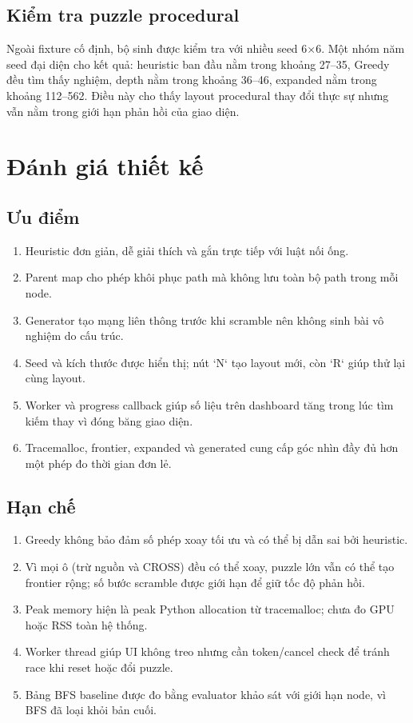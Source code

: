 \documentclass[12pt,a4paper]{article}
\begin{document}
\subsection{Kiểm tra puzzle procedural}
Ngoài fixture cố định, bộ sinh được kiểm tra với nhiều seed 6\(\times\)6. Một nhóm năm seed đại diện cho kết quả: heuristic ban đầu nằm trong khoảng 27--35, Greedy đều tìm thấy nghiệm, depth nằm trong khoảng 36--46, expanded nằm trong khoảng 112--562. Điều này cho thấy layout procedural thay đổi thực sự nhưng vẫn nằm trong giới hạn phản hồi của giao diện.

\section{Đánh giá thiết kế}
\subsection{Ưu điểm}
\begin{enumerate}[label=\arabic*.]
  \item Heuristic đơn giản, dễ giải thích và gắn trực tiếp với luật nối ống.
  \item Parent map cho phép khôi phục path mà không lưu toàn bộ path trong mỗi node.
  \item Generator tạo mạng liên thông trước khi scramble nên không sinh bài vô nghiệm do cấu trúc.
  \item Seed và kích thước được hiển thị; nút `N` tạo layout mới, còn `R` giúp thử lại cùng layout.
  \item Worker và progress callback giúp số liệu trên dashboard tăng trong lúc tìm kiếm thay vì đóng băng giao diện.
  \item Tracemalloc, frontier, expanded và generated cung cấp góc nhìn đầy đủ hơn một phép đo thời gian đơn lẻ.
\end{enumerate}

\subsection{Hạn chế}
\begin{enumerate}[label=\arabic*.]
  \item Greedy không bảo đảm số phép xoay tối ưu và có thể bị dẫn sai bởi heuristic.
  \item Vì mọi ô (trừ nguồn và CROSS) đều có thể xoay, puzzle lớn vẫn có thể tạo frontier rộng; số bước scramble được giới hạn để giữ tốc độ phản hồi.
  \item Peak memory hiện là peak Python allocation từ tracemalloc; chưa đo GPU hoặc RSS toàn hệ thống.
  \item Worker thread giúp UI không treo nhưng cần token/cancel check để tránh race khi reset hoặc đổi puzzle.
  \item Bảng BFS baseline được đo bằng evaluator khảo sát với giới hạn node, vì BFS đã loại khỏi bản cuối.
\end{enumerate}
\end{document}
